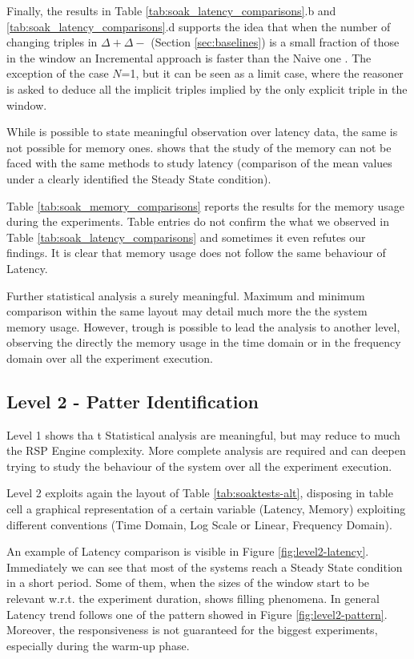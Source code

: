 Finally, the results in Table \ref{tab:soak_latency_comparisons}.b and \ref{tab:soak_latency_comparisons}.d supports the idea that when the number of changing triples in $\Delta+ \Delta-$ (Section \ref{sec:baselines}) is a small fraction of those in the window an Incremental approach is faster than the Naive one \cite{DellAglio2014,DBLP:conf/cikm/RenP11,DBLP:conf/semweb/UrbaniMJHB13}. The exception of the case $N$=1, but it can be seen as a limit case, where the reasoner is asked to deduce all the implicit triples implied by the only explicit triple in the window.  

While is possible to state meaningful observation over latency data, the same is not possible for memory ones. \name shows that the study of the memory can not be faced with the same methods to study latency (comparison of the mean values under a clearly identified the Steady State condition). 

Table \ref{tab:soak_memory_comparisons} reports the results for the memory usage during the experiments. Table entries do not confirm the what we observed in Table \ref{tab:soak_latency_comparisons} and sometimes it even refutes our findings. It is clear that memory usage does not follow the same behaviour of Latency.

Further statistical analysis a surely meaningful. Maximum and minimum comparison within the same layout may detail much more the the system memory usage. However, trough \name is possible to lead the analysis to another level, observing the directly the memory usage in the time domain or in the frequency domain over all the experiment execution. 

\subsection{Level 2 - Patter Identification}

Level 1 shows tha t Statistical analysis are meaningful, but may reduce to much the RSP Engine complexity. More complete analysis are required and \name can deepen trying to study the behaviour of the system over all the experiment execution.

Level 2 exploits again the layout of Table \ref{tab:soaktests-alt}, disposing in table cell a graphical representation of a certain variable (Latency, Memory) exploiting different conventions (Time Domain, Log Scale or Linear, Frequency Domain).

An example of Latency comparison is visible in Figure \ref{fig:level2-latency}. Immediately we can see that most of the systems reach a Steady State condition in a short period. Some of them, when the sizes of the window start to be relevant w.r.t. the experiment duration, shows filling phenomena. In general Latency trend follows one of the pattern showed in Figure \ref{fig:level2-pattern}. Moreover, the responsiveness is not guaranteed for the biggest experiments, especially during the warm-up phase.

